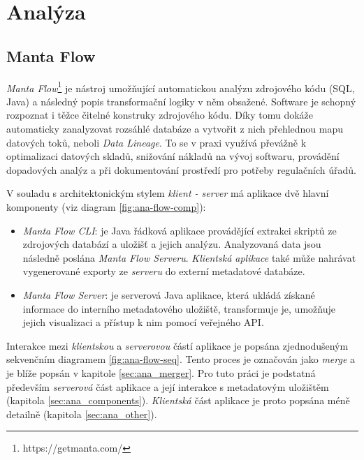 \chapter{Analýza}
\section{Manta Flow}
\textit{Manta Flow}\footnote{https://getmanta.com/} je nástroj umožňující automatickou analýzu zdrojového kódu (SQL, Java) a následný popis transformační logiky v něm obsažené. Software je schopný rozpoznat i těžce čitelné konstruky zdrojového kódu. Díky tomu dokáže automaticky zanalyzovat rozsáhlé databáze a vytvořit z nich přehlednou mapu datových toků, neboli \textit{Data Lineage}. To se v praxi využívá převážně k optimalizaci datových skladů, snižování nákladů na vývoj softwaru, provádění dopadových analýz a při dokumentování prostředí pro potřeby regulačních úřadů.

V souladu s architektonickým stylem \textit{klient - server} má aplikace dvě hlavní komponenty (viz diagram \ref{fig:ana-flow-comp}):
\begin{itemize}
	\item{\textit{Manta Flow CLI}}: je Java řádková aplikace provádějící extrakci skriptů ze zdrojových databází a uložišť a jejich analýzu. Analyzovaná data jsou následně poslána \textit{Manta Flow Serveru}. \textit{Klientská aplikace} také může nahrávat vygenerované exporty ze \textit{serveru} do externí metadatové databáze.
	\item{\textit{Manta Flow Server}}: je serverová Java aplikace, která ukládá získané informace do interního metadatového uložiště, transformuje je, umožňuje jejich visualizaci a přístup k nim pomocí veřejného API.
\end{itemize}

Interakce mezi \textit{klientskou} a \textit{serverovou} částí aplikace je popsána zjednodušeným sekvenčním diagramem \ref{fig:ana-flow-seq}. Tento proces je označován jako \textit{merge} a je blíže popsán v kapitole \ref{sec:ana_merger}.
Pro tuto práci je podstatná především \textit{serverová} část aplikace a její interakce s metadatovým uložištěm (kapitola \ref{sec:ana_components}). \textit{Klientská} část aplikace je proto popsána méně detailně (kapitola \ref{sec:ana_other}).


